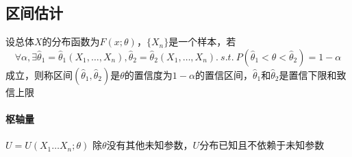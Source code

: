 \documentclass[a4paper]{ctexart}
\begin{document}
\subsection{区间估计}
设总体$X$的分布函数为$F(x;\theta)$，$\{X_n\}$是一个样本，若
\[\forall \alpha, \exists \hat{\theta}_1=\hat{\theta}_1(X_1,\ldots,X_n),\hat{\theta}_2=\hat{\theta}_2(X_1,\ldots,X_n).\ s.t.\ P(\hat{\theta}_1<\theta<\hat{\theta}_2)=1-\alpha\]
成立，则称区间$(\hat{\theta}_1,\hat{\theta}_2)$是$\theta$的置信度为$1-\alpha$的置信区间，$\hat{\theta}_1$和$\hat{\theta}_2$是置信下限和致信上限
\paragraph{枢轴量} $U=U(X_1\ldots X_n;\theta)$ 除$\theta$没有其他未知参数，$U$分布已知且不依赖于未知参数
\end{document}
